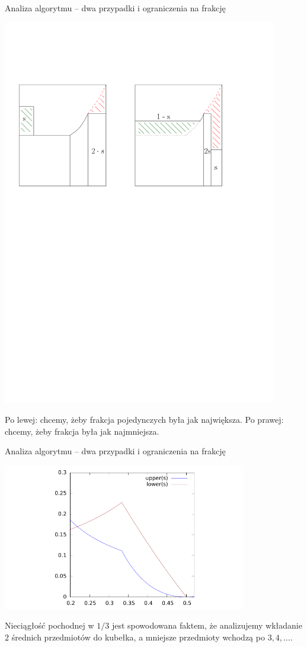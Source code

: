 \documentclass{beamer}
\begin{document}
\begin{frame}{Analiza algorytmu -- dwa przypadki i ograniczenia na frakcję}
  \begin{center}
    \includegraphics[width=0.9\textwidth]{figs/G1G2_insuff.pdf}
  \end{center}

  Po lewej: chcemy, żeby frakcja pojedynczych była jak największa. Po prawej: chcemy, żeby frakcja była jak najmniejsza.
\end{frame}


\begin{frame}{Analiza algorytmu -- dwa przypadki i ograniczenia na frakcję}
  \begin{center}
    \includegraphics[width=0.8\textwidth]{figs/04.pdf}
  \end{center}

  \tiny Nieciągłość pochodnej w $1/3$ jest spowodowana faktem, że analizujemy wkładanie $2$ średnich przedmiotów do kubełka, a mniejsze przedmioty wchodzą po $3, 4, \ldots$.
\end{frame}
\end{document}
